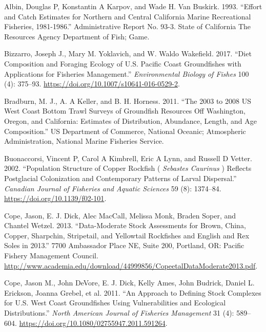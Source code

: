 \documentclass[11pt,
  english,
  a4paper,
]{article}
\begin{document}
\hypertarget{refs}{}
\begin{cslreferences}
\leavevmode\hypertarget{ref-albin_effort_1993}{}%
Albin, Douglas P, Konstantin A Karpov, and Wade H. Van Buskirk. 1993. ``Effort and Catch Estimates for Northern and Central California Marine Recreational Fisheries, 1981-1986.'' Administrative Report No. 93-3. State of California The Resources Agency Department of Fish; Game.

\leavevmode\hypertarget{ref-bizzarro_diet_2017-1}{}%
Bizzarro, Joseph J., Mary M. Yoklavich, and W. Waldo Wakefield. 2017. ``Diet Composition and Foraging Ecology of U.S. Pacific Coast Groundfishes with Applications for Fisheries Management.'' \emph{Environmental Biology of Fishes} 100 (4): 375--93. \url{https://doi.org/10.1007/s10641-016-0529-2}.

\leavevmode\hypertarget{ref-bradburn_2003_2011}{}%
Bradburn, M. J., A. A Keller, and B. H. Horness. 2011. ``The 2003 to 2008 US West Coast Bottom Trawl Surveys of Groundfish Resources Off Washington, Oregon, and California: Estimates of Distribution, Abundance, Length, and Age Composition.'' US Department of Commerce, National Oceanic; Atmospheric Administration, National Marine Fisheries Service.

\leavevmode\hypertarget{ref-buonaccorsi_population_2002}{}%
Buonaccorsi, Vincent P, Carol A Kimbrell, Eric A Lynn, and Russell D Vetter. 2002. ``Population Structure of Copper Rockfish ( \emph{Sebastes Caurinus} ) Reflects Postglacial Colonization and Contemporary Patterns of Larval Dispersal.'' \emph{Canadian Journal of Fisheries and Aquatic Sciences} 59 (8): 1374--84. \url{https://doi.org/10.1139/f02-101}.

\leavevmode\hypertarget{ref-cope_data-moderate_2013}{}%
Cope, Jason, E. J. Dick, Alec MacCall, Melissa Monk, Braden Soper, and Chantel Wetzel. 2013. ``Data-Moderate Stock Assessments for Brown, China, Copper, Sharpchin, Stripetail, and Yellowtail Rockfishes and English and Rex Soles in 2013.'' 7700 Ambassador Place NE, Suite 200, Portland, OR: Pacific Fishery Management Council. \url{http://www.academia.edu/download/44999856/CopeetalDataModerate2013.pdf}.

\leavevmode\hypertarget{ref-cope_approach_2011}{}%
Cope, Jason M., John DeVore, E. J. Dick, Kelly Ames, John Budrick, Daniel L. Erickson, Joanna Grebel, et al. 2011. ``An Approach to Defining Stock Complexes for U.S. West Coast Groundfishes Using Vulnerabilities and Ecological Distributions.'' \emph{North American Journal of Fisheries Management} 31 (4): 589--604. \url{https://doi.org/10.1080/02755947.2011.591264}.


\end{cslreferences}
\end{document}
